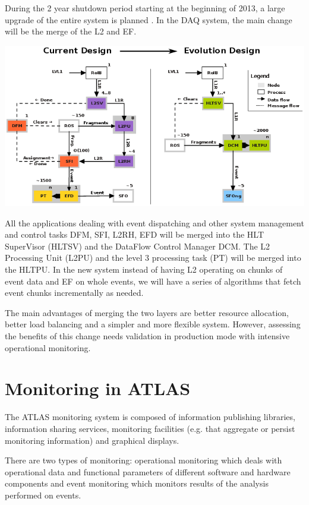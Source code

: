 During the 2 year shutdown period starting at the beginning of 2013, a large upgrade of the entire system is planned \citep{hauser2012atlas}. In the DAQ system, the main change will be the merge of the L2 and EF.  

\includegraphics[scale=0.55]{Images/Evolution.png}

All the applications dealing with event dispatching and other system management and control tasks DFM, SFI, L2RH, EFD will be merged into the HLT SuperVisor (HLTSV) and the DataFlow Control Manager DCM. 
The L2 Processing Unit (L2PU) and the level 3 processing task (PT) will be merged into the HLTPU. In the new system instead of having L2 operating on chunks of event data and EF on whole events, we will have a series of algorithms that fetch event chunks incrementally as needed.

The main advantages of merging the two layers are better resource allocation, better load balancing and a simpler and more flexible system. However, assessing the benefits of this change needs validation in production mode with intensive operational monitoring.

\section*{Monitoring in ATLAS}

The ATLAS monitoring system \citep{collaboration2003atlas} is composed of information publishing libraries, information sharing services, monitoring facilities (e.g. that aggregate or persist monitoring information) and graphical displays.

There are two types of monitoring: operational monitoring which deals with operational data and functional parameters of different software and hardware components and event monitoring which monitors results of the analysis performed on events.

